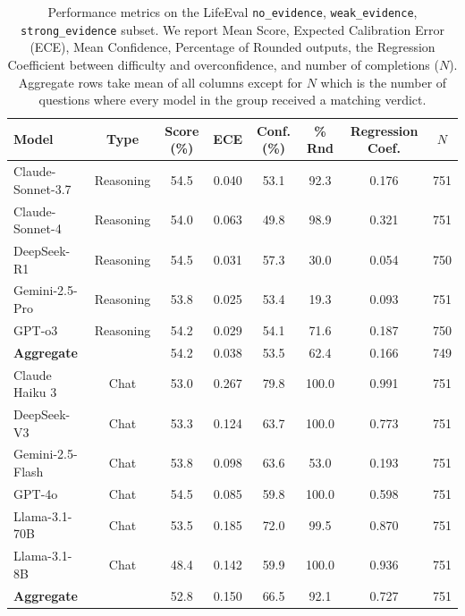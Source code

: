 \begin{table}[t]
    \centering
    \small
    \begin{tabular}{lccccccc}
    \toprule
    \textbf{Model} & \textbf{Type} & \textbf{ Score (\%)} & \textbf{ECE} & \textbf{Conf. (\%)} & \textbf{\% Rnd} & \textbf{Regression Coef.} & \textbf{$N$} \\
    \midrule
    Claude-Sonnet-3.7    & Reasoning & 54.5 & 0.040 & 53.1 & 92.3  & 0.176 & 751 \\
    Claude-Sonnet-4      & Reasoning & 54.0 & 0.063 & 49.8 & 98.9  & 0.321 & 751 \\
    DeepSeek-R1          & Reasoning & 54.5 & 0.031 & 57.3 & 30.0  & 0.054 & 750 \\
    Gemini-2.5-Pro       & Reasoning & 53.8 & 0.025 & 53.4 & 19.3  & 0.093 & 751 \\
    GPT-o3               & Reasoning & 54.2 & 0.029 & 54.1 & 71.6  & 0.187 & 750 \\
    \midrule  %
    {\textbf{Aggregate}}  &           & 54.2 & 0.038 & 53.5 & 62.4  & 0.166 & 749 \\
    \toprule    %
    Claude Haiku 3       & Chat & 53.0 & 0.267 & 79.8 & 100.0  & 0.991 & 751 \\
    DeepSeek-V3          & Chat & 53.3 & 0.124 & 63.7 & 100.0  & 0.773 & 751 \\
    Gemini-2.5-Flash     & Chat & 53.8 & 0.098 & 63.6 & 53.0  & 0.193 & 751 \\
    GPT-4o               & Chat & 54.5 & 0.085 & 59.8 & 100.0  & 0.598 & 751 \\
    Llama-3.1-70B        & Chat & 53.5 & 0.185 & 72.0 & 99.5  & 0.870 & 751 \\
    Llama-3.1-8B         & Chat & 48.4 & 0.142 & 59.9 & 100.0  & 0.936 & 751 \\
    \midrule  %
    {\textbf{Aggregate}}  &           & 52.8 & 0.150 & 66.5 & 92.1  & 0.727 & 751 \\

    \bottomrule
    \end{tabular}
    \caption{Performance metrics on the LifeEval \texttt{no\_evidence}, \texttt{weak\_evidence}, \texttt{strong\_evidence} subset. We report Mean Score, Expected Calibration Error (ECE), Mean Confidence, Percentage of Rounded outputs, the Regression Coefficient between difficulty and overconfidence, and number of completions ($N$). Aggregate rows take mean of all columns except for $N$ which is the number of questions where every model in the group received a matching verdict.}
    \label{}
\end{table}
